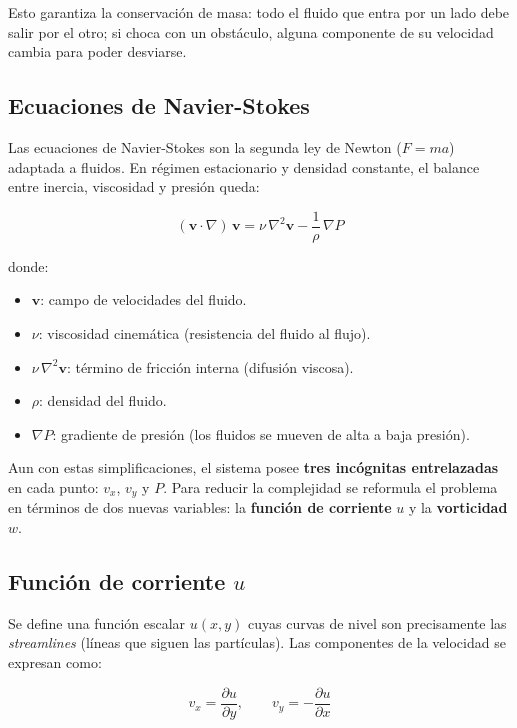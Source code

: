 \documentclass[12pt, a4paper]{article}
\begin{document}
Esto garantiza la conservación de masa: todo el fluido que entra por un lado
debe salir por el otro; si choca con un obstáculo, alguna componente de su
velocidad cambia para poder desviarse.

\subsection{Ecuaciones de Navier-Stokes}

Las ecuaciones de Navier-Stokes son la segunda ley de Newton ($F = ma$)
adaptada a fluidos. En régimen estacionario y densidad constante, el balance
entre inercia, viscosidad y presión queda:

\begin{equation}
  (\mathbf{v} \cdot \nabla)\,\mathbf{v}
  = \nu\,\nabla^{2}\mathbf{v} - \frac{1}{\rho}\,\nabla P
\end{equation}

donde:
\begin{itemize}
  \item $\mathbf{v}$: campo de velocidades del fluido.
  \item $\nu$: viscosidad cinemática (resistencia del fluido al flujo).
  \item $\nu\,\nabla^{2}\mathbf{v}$: término de fricción interna (difusión viscosa).
  \item $\rho$: densidad del fluido.
  \item $\nabla P$: gradiente de presión (los fluidos se mueven de alta a baja presión).
\end{itemize}

Aun con estas simplificaciones, el sistema posee \textbf{tres incógnitas
entrelazadas} en cada punto: $v_x$, $v_y$ y $P$. Para reducir la complejidad se
reformula el problema en términos de dos nuevas variables: la \textbf{función de
corriente} $u$ y la \textbf{vorticidad} $w$.

\subsection{Función de corriente \texorpdfstring{$u$}{u}}

Se define una función escalar $u(x,y)$ cuyas curvas de nivel son precisamente
las \emph{streamlines} (líneas que siguen las partículas). Las componentes de la
velocidad se expresan como:

\begin{equation}
  v_x = \frac{\partial u}{\partial y}, \qquad
  v_y = -\frac{\partial u}{\partial x}
\end{equation}
\end{document}
